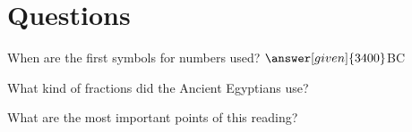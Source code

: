 \documentclass{ximera}
\begin{document}
\section{Questions}



\begin{question}
When are the first symbols for numbers used?  $\answer[given]{3400}$BC
\end{question}



\begin{question}
What kind of fractions did the Ancient Egyptians use?
\begin{multipleChoice}
\end{multipleChoice}
\end{question}



\begin{question}
What are the most important points of this reading?
\begin{freeResponse}
\end{freeResponse}
\end{question}
\end{document}
